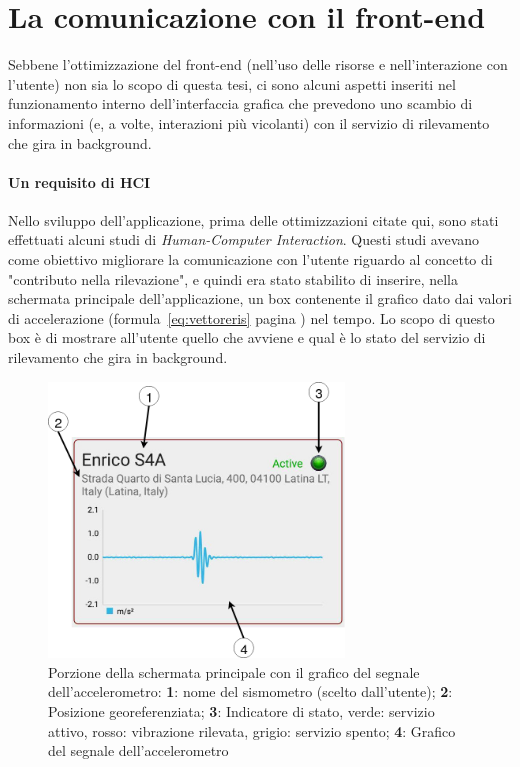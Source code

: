 \documentclass[a4paper,10pt]{memoir}
\begin{document}
\clearpage

\section{La comunicazione con il front-end}
\label{section:frontend}

Sebbene l'ottimizzazione del front-end (nell'uso delle risorse e nell'interazione con l'utente) non sia lo scopo di questa tesi, ci sono alcuni aspetti inseriti nel funzionamento interno dell'interfaccia grafica che prevedono uno scambio di informazioni (e, a volte, interazioni più vicolanti) con il servizio di rilevamento che gira in background.

\paragraph{Un requisito di HCI} Nello sviluppo dell'applicazione, prima delle ottimizzazioni citate qui, sono stati effettuati alcuni studi di \textit{Human-Computer Interaction}. Questi studi avevano come obiettivo migliorare la comunicazione con l'utente riguardo al concetto di "contributo nella rilevazione", e quindi era stato stabilito di inserire, nella schermata principale dell'applicazione, un box contenente il grafico dato dai valori di accelerazione (formula~\ref{eq:vettoreris} pagina \pageref{eq:vettoreris}) nel tempo. Lo scopo di questo box è di mostrare all'utente quello che avviene e qual è lo stato del servizio di rilevamento che gira in background.

\begin{figure}[ht]
\centering
\includegraphics[width=0.7\textwidth]{app/activitychart2}
\caption{Porzione della schermata principale con il grafico del segnale dell'accelerometro: \textbf{1}: nome del sismometro (scelto dall'utente); \textbf{2}: Posizione georeferenziata; \textbf{3}: Indicatore di stato, verde: servizio attivo, rosso: vibrazione rilevata, grigio: servizio spento; \textbf{4}: Grafico del segnale dell'accelerometro}
\label{fig:activitychart}
\end{figure}
\end{document}
